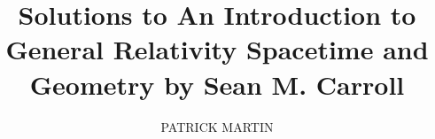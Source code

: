 \documentclass{uicthesi_modified}
\begin{document}
\title{Solutions to An Introduction to General Relativity Spacetime and Geometry by Sean M. Carroll}

\author{PATRICK MARTIN}


\degree{}

\committee{}

\maketitle
\copyrightpage



\end{document}
